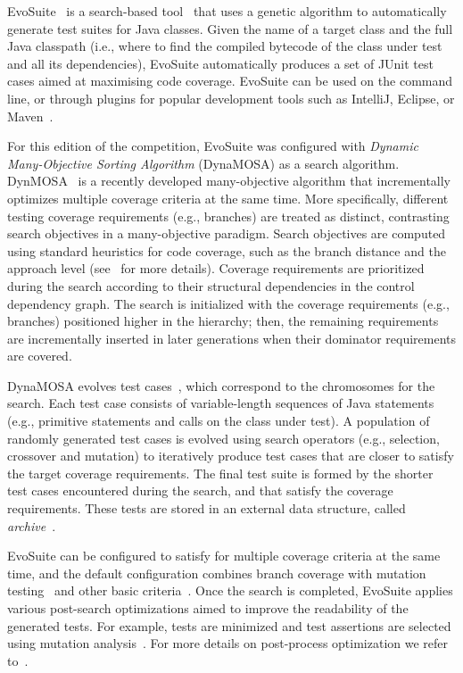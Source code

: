 \documentclass[sigconf,table]{acmart}
\newcommand{\EVOSUITE}{{\sc EvoSuite}\xspace}
\begin{document}
\EVOSUITE~\cite{FrA11c} is a search-based tool~\cite{GoA_TSE12} that
uses a genetic algorithm to automatically generate test suites for
Java classes. Given the name of a target class and the full Java
classpath (i.e., where to find the compiled bytecode of the class
under test and all its dependencies), \EVOSUITE automatically produces
a set of JUnit test cases aimed at maximising code coverage. \EVOSUITE
can be used on the command line, or through plugins for popular
development tools such as IntelliJ, Eclipse, or
Maven~\cite{ICST16_Tool}.

For this edition of the competition, \EVOSUITE was configured with \textit{Dynamic Many-Objective Sorting Algorithm} (DynaMOSA) as a search algorithm. DynMOSA~\cite{dynamosa, panichella:ssbse2018} is a recently developed many-objective algorithm that incrementally optimizes multiple coverage criteria at the same time. More specifically, different testing coverage requirements (e.g., branches) are treated as distinct, contrasting search objectives in a many-objective paradigm. Search objectives are computed using standard heuristics for code coverage, such as the branch distance and the approach level (see~\cite{GoA_TSE12} for more details). Coverage requirements are prioritized during the search according to their structural dependencies in the control dependency graph. The search is initialized with the coverage requirements (e.g., branches) positioned higher in the hierarchy; then, the remaining requirements are incrementally inserted in later generations when their dominator requirements are covered.

DynaMOSA evolves test cases~\cite{dynamosa}, which correspond to the chromosomes for the search. Each test case consists of variable-length sequences of Java statements (e.g., primitive statements and calls on the class under test). A population of randomly generated test cases is evolved using search operators (e.g., selection, crossover and mutation) to iteratively produce test cases that are closer to satisfy the target coverage requirements. The final test suite is formed by the shorter test cases encountered during the search, and that satisfy the coverage requirements. These tests are stored in an external data structure, called \textit{archive}~\cite{mosa,dynamosa}.

\EVOSUITE can be configured to satisfy for multiple coverage criteria at the same time, and the default configuration combines branch coverage with
mutation testing~\cite{emse14_mutation} and other basic
criteria~\cite{rojas2015combining}. Once the search is completed, \EVOSUITE applies various post-search optimizations aimed to improve the readability of
the generated tests. For example, tests are minimized and test assertions are selected using mutation analysis~\cite{10.1109/TSE.2011.93}. For more details on post-process optimization we refer to~\cite{FrA11c,FrA13a}.
\end{document}
